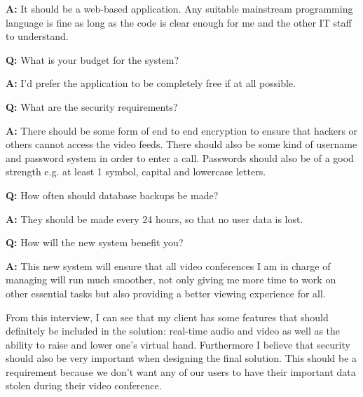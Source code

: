 \begin{tcolorbox}[
  boxrule=0pt, frame empty, colback=lightestgray, arc=0pt,
  breakable, colframe=white
]
  \textbf{A:} It should be a web-based application. Any 
  suitable mainstream programming language is fine as long as 
  the code is clear enough for me and the other IT staff to 
  understand.
  \vspace{0.25cm}

  \textbf{Q:} What is your budget for the system?
  \vspace{0.05cm}

  \textbf{A:} I'd prefer the application to be completely free
  if at all possible. \vspace{0.25cm}

  \textbf{Q:} What are the security requirements?
  \vspace{0.05cm}

  \textbf{A:} There should be some form of end to end 
  encryption to ensure that hackers or others cannot access the
  video feeds. There should also be some kind of username and 
  password system in order to enter a call. Passwords should 
  also be of a good strength e.g. at least 1 symbol, capital
  and lowercase letters.
  \vspace{0.25cm}

  \textbf{Q:} How often should database backups be made?
  \vspace{0.05cm}

  \textbf{A:} They should be made every 24 hours, so that no 
  user data is lost.
  \vspace{0.25cm}


  \textbf{Q:} How will the new system benefit you? 
  \vspace{0.05cm}

  \textbf{A:} This new system will ensure that all video 
  conferences I am in charge of managing will run much 
  smoother, not only giving me more time to work on other 
  essential tasks but also providing a better viewing
  experience for all.

\end{tcolorbox}

From this interview, I can see that my client has some features
that should definitely be included in the solution: real-time 
audio and video as well as the ability to raise and lower one's
virtual hand. Furthermore I believe that security should also 
be very important when designing the final solution. This 
should be a requirement because we don't want any of our users
to have their important data stolen during their video
conference. \vspace{0.2cm}

